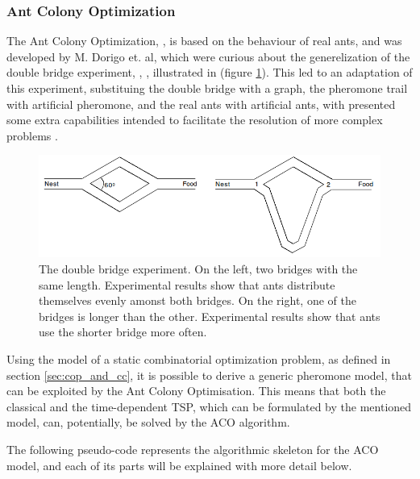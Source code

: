 \subsubsection{Ant Colony Optimization}

The Ant Colony Optimization, \cite{aco_original, aco_2, aco_overview_advances}, is based on the behaviour of real ants, and was developed by M. Dorigo et. al,
which were curious about the generelization of the double bridge experiment, \cite{double_bridge_1}, \cite{double_bridge_2}, illustrated in 
(figure \ref{fig:double_bridge}).
This led to an adaptation of this experiment, substituing the double bridge with a graph,
the pheromone trail with artificial pheromone, and the real ants with artificial ants,
with presented some extra capabilities intended to facilitate the resolution of more complex problems \cite{aco_overview_advances}.

\begin{figure}[]
  \centering
  \includegraphics[width=\textwidth]{Figures/aco/double_bridge.png}
	\caption{The double bridge experiment. On the left, two bridges with the same length. Experimental results show that ants distribute themselves evenly amonst both bridges. 
On the right, one of the bridges is longer than the other. Experimental results show that ants use the shorter bridge more often.}
  \label{fig:double_bridge}  
\end{figure}


Using the model of a static combinatorial optimization problem, as defined in section \ref{sec:cop_and_cc},
it is possible to derive a generic pheromone model, that can be exploited by the Ant Colony Optimisation.
This means that both the classical and the time-dependent TSP, which can be formulated 
by the mentioned model, can, potentially, be solved by the ACO algorithm.

The following pseudo-code represents the algorithmic skeleton for the ACO model,
and each of its parts will be explained with more detail below.



